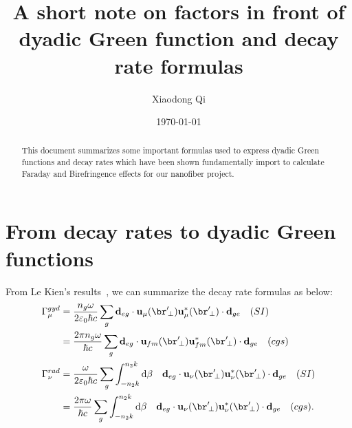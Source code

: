 \documentclass[preprint,aps,pra,onecolumn]{revtex4-1}
\begin{document}
\title{A short note on factors in front of dyadic Green function and decay rate formulas}
\author{Xiaodong Qi}
\date{\today}

\begin{abstract}
This document summarizes some important formulas used to express dyadic Green functions and decay 
rates which have been shown fundamentally import to calculate Faraday and Birefringence effects for 
our nanofiber project. 
\end{abstract}

\section{From decay rates to dyadic Green functions}

From Le Kien's results~\cite{LeKien2005,LeKien2014}, we can summarize the decay rate formulas as 
below:
\begin{align}
\Gamma_{\mu}^{gyd} &= \frac{n_g\omega}{2\varepsilon_0 \hbar c} \sum_g \mathbf{d}_{eg}\cdot 
\mathbf{u}_{\mu}(\br^\prime\!_\perp) \mathbf{u}_{\mu}^* (\br^\prime\!_\perp) \cdot \mathbf{d}_{ge} 
\quad (SI)\\
&=  \frac{2\pi n_g\omega}{ \hbar c} \sum_g \mathbf{d}_{eg}\cdot \mathbf{u}_{fm}(\br^\prime\!_\perp) 
\mathbf{u}_{fm}^* (\br^\prime\!_\perp) \cdot \mathbf{d}_{ge} \quad (cgs) \\ 
\Gamma_{\nu }^{rad} &=  \frac{\omega}{2\varepsilon_0 \hbar c} \sum_g \int_{-n_2 k }^{n_2 
k}\mathrm{d}\beta\quad \mathbf{d}_{eg}\cdot 
\mathbf{u}_{\nu}(\br^\prime\!_\perp) \mathbf{u}_{\nu}^* (\br^\prime\!_\perp) \cdot \mathbf{d}_{ge} 
\quad (SI)\\
&=  \frac{2\pi \omega}{ \hbar c} \sum_g \int_{-n_2 k }^{n_2 k}\mathrm{d}\beta \quad 
\mathbf{d}_{eg}\cdot 
\mathbf{u}_{\nu}(\br^\prime\!_\perp) \mathbf{u}_{\nu}^* (\br^\prime\!_\perp) \cdot \mathbf{d}_{ge} 
\quad (cgs).
\end{align}
\end{document}

